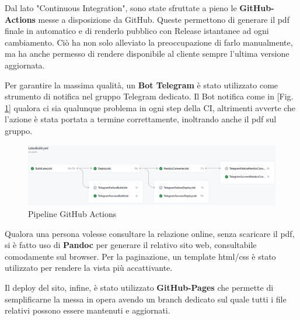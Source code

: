         Dal lato "Continuous Integration", sono state sfruttate a pieno le \textbf{GitHub-Actions} messe a disposizione da GitHub. Queste permettono di generare il pdf finale in automatico e di renderlo pubblico con Release istantanee ad ogni cambiamento. Ciò ha non solo alleviato la preoccupazione di farlo manualmente, ma ha anche permesso di rendere disponibile al cliente sempre l'ultima versione aggiornata. 

        Per garantire la massima qualità, un \textbf{Bot Telegram} è stato utilizzato come strumento di notifica nel gruppo Telegram dedicato. Il Bot notifica come in [Fig. \ref{fig:ci-github}] qualora ci sia qualunque problema in ogni step della CI, altrimenti avverte che l'azione è stata portata a termine correttamente, inoltrando anche il pdf sul gruppo. 

        \begin{figure}[H]
            \caption{Pipeline GitHub Actions}
            \label{fig:ci-github}
            \centering
            \includegraphics[width=1\textwidth]{Images/gh-pipeline.png}
        \end{figure}

        Qualora una persona volesse consultare la relazione online, senza scaricare il pdf, si è fatto uso di \textbf{Pandoc} per generare il relativo sito web, consultabile comodamente sul browser. Per la paginazione, un template html/css è stato utilizzato per rendere la vista più accattivante.

        Il deploy del sito, infine, è stato utilizzato \textbf{GitHub-Pages} che permette di semplificarne la messa in opera avendo un branch dedicato sul quale tutti i file relativi possono essere mantenuti e aggiornati.
        

